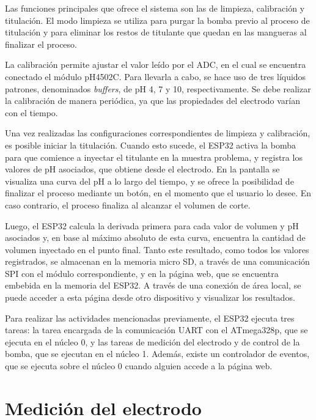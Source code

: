 Las funciones principales que ofrece el sistema son las de limpieza, calibración y titulación. El modo limpieza se utiliza para purgar la bomba previo al proceso de titulación y para eliminar los restos de titulante que quedan en las mangueras al finalizar el proceso. 

La calibración permite ajustar el valor leído por el ADC, en el cual se encuentra conectado el módulo pH4502C. Para llevarla a cabo, se hace uso de tres líquidos patrones, denominados \textit{buffers}, de pH 4, 7 y 10, respectivamente. Se debe realizar la calibración de manera periódica, ya que las propiedades del electrodo varían con el tiempo.

Una vez realizadas las configuraciones correspondientes de limpieza y calibración, es posible iniciar la titulación. Cuando esto sucede, el ESP32 activa  la bomba para que comience a inyectar el titulante en la muestra problema, y registra los valores de pH asociados, que obtiene desde el electrodo. En la pantalla se visualiza una curva del pH a lo largo del tiempo, y se ofrece la posibilidad de finalizar el proceso mediante un botón, en el momento que el usuario lo desee. En caso contrario, el proceso finaliza al alcanzar el volumen de corte.

Luego, el ESP32 calcula la derivada primera para cada valor de volumen y pH asociados y, en base al máximo absoluto de esta curva, encuentra la cantidad de volumen inyectado en el punto final. Tanto este resultado, como todos los valores registrados, se almacenan en la memoria micro SD, a través de una comunicación SPI con el módulo correspondiente, y en la página web, que se encuentra embebida en la memoria del ESP32. A través de una conexión de área local, se puede acceder a esta página desde otro dispositivo y visualizar los resultados.

Para realizar las actividades mencionadas previamente, el ESP32 ejecuta tres tareas: la tarea encargada de la comunicación UART con el ATmega328p, que se ejecuta en el núcleo 0, y las tareas de medición del electrodo y de control de la bomba, que se ejecutan en el núcleo 1. Además, existe un controlador de eventos, que se ejecuta sobre el núcleo 0 cuando alguien accede a la página web.


\section{Medición del electrodo}


